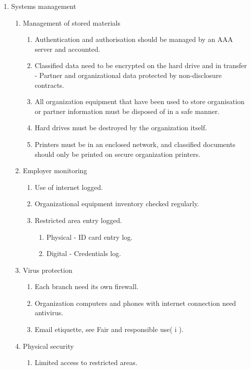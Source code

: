 \begin{enumerate}
  \item Systems management
  \begin{enumerate}
    \item Management of stored materials
    \begin{enumerate}
      \item Authentication and authorisation should be managed by an AAA server and accounted.
      \item Classified data need to be encrypted on the hard drive and in transfer - Partner and organizational data protected by non-disclosure contracts.
      \item All organization equipment that have been used to store organisation or partner information must be disposed of in a safe manner.
      \item Hard drives must be destroyed by the organization itself.
      \item Printers must be in an enclosed network, and classified documents should only be printed on secure organization printers.
    \end{enumerate}
    \item Employer monitoring
    \begin{enumerate}
      \item Use of internet logged.
      \item Organizational equipment inventory checked regularly.
      \item Restricted area entry logged.
      \begin{enumerate}
        \item Physical - ID card entry log.
        \item Digital - Credentials log.
      \end{enumerate}
    \end{enumerate}
    \item Virus protection
    \begin{enumerate}
      \item Each branch need its own firewall.
      \item Organization computers and phones with internet connection need antivirus.
      \item Email etiquette, see Fair and responsible use( i ).
    \end{enumerate}
    \item Physical security
    \begin{enumerate}
      \item Limited access to restricted areas.
      \begin{enumerate}

\end{enumerate}
\end{enumerate}
\end{enumerate}
\end{enumerate}
